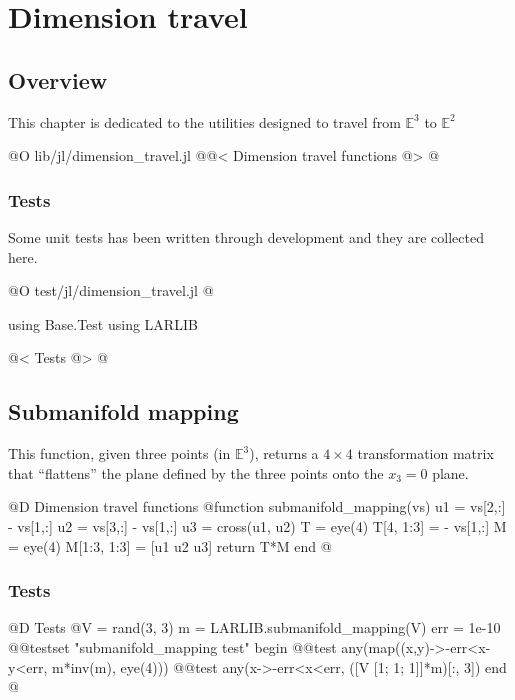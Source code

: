 
\chapter{Dimension travel}
\label{ch:dimension_travel}

\section{Overview}

This chapter is dedicated to
the utilities designed to travel
from $\mathbb{E}^3$ to $\mathbb{E}^2$

@O lib/jl/dimension_travel.jl
@{@< Dimension travel functions @>
@}
\subsection{Tests}

Some unit tests has been written through development and
they are collected here.

@O test/jl/dimension_travel.jl
@{using Base.Test
using LARLIB

@< Tests @>
@}


\section{Submanifold mapping}
\label{sec:submanifold_mapping}

This function, given three points (in $\mathbb{E}^3$), 
returns a $4\times4$ transformation matrix that ``flattens''
the plane defined by the three points onto the $x_3=0$ plane.

@D Dimension travel functions
@{function submanifold_mapping(vs)
    u1 = vs[2,:] - vs[1,:]
    u2 = vs[3,:] - vs[1,:]
    u3 = cross(u1, u2)
    T = eye(4)
    T[4, 1:3] = - vs[1,:]
    M = eye(4)
    M[1:3, 1:3] = [u1 u2 u3]
    return T*M
end
@}
\subsection{Tests}

@D Tests
@{V = rand(3, 3)
m = LARLIB.submanifold_mapping(V)
err = 1e-10 
@@testset "submanifold_mapping test" begin
    @@test any(map((x,y)->-err<x-y<err, m*inv(m), eye(4)))
    @@test any(x->-err<x<err, ([V [1; 1; 1]]*m)[:, 3])
end
@}





